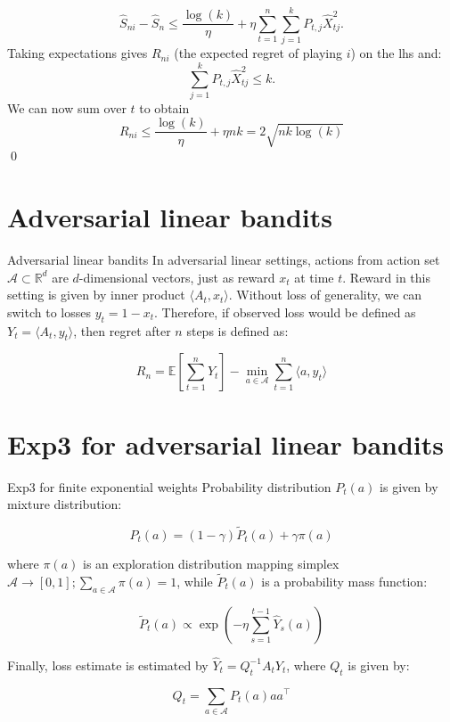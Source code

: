 \documentclass[aspectratio=169,xcolor=dvipsnames]{beamer}
\begin{document}
\begin{frame}
  \[
    \hat{S}_{ni} - \hat{S}_n
    \leq
    \frac{\log(k)}{\eta}
    +
    \eta
    \sum_{t=1}^n \sum_{j=1}^k P_{t,j} \hat{X}^2_{tj}.
  \]
  \pause
  Taking expectations gives $R_{ni}$ (the expected regret of playing $i$) on the lhs and:
  \[
    \sum_{j=1}^k P_{t,j} \hat{X}^2_{tj} \leq k.
  \]
  \pause
  We can now sum over $t$ to obtain
  \[
    R_{ni} \leq \frac{\log(k)}{\eta} + \eta n k = 2 \sqrt{n k \log (k)}
  \]
  \qed
\end{frame}

\section{Adversarial linear bandits}
\begin{frame}{Adversarial linear bandits}
    In adversarial linear settings, actions from action set $\mathbf{\mathcal{A}} \subset \mathbb{R}^d$ are $d$-dimensional vectors, just as reward $x_t$ at time $t$. Reward in this setting is given by inner product $\langle A_t, x_t \rangle$. Without loss of generality, we can switch to losses $y_t = 1 - x_t$. Therefore, if observed loss would be defined as $Y_t = \langle A_t, y_t \rangle$, then regret after $n$ steps is defined as:

    \begin{equation}
        R_n = \mathbb{E} \left[ \sum_{t=1}^{n} Y_t \right] - \min_{a \in \mathbf{\mathcal{A}}} \sum_{t=1}^{n} \langle a, y_t \rangle
    \end{equation}
\end{frame}

\section{Exp3 for adversarial linear bandits}
\begin{frame}{Exp3 for finite exponential weights}
    Probability distribution $P_t(a)$ is given by mixture distribution:

    \begin{equation}
        P_t(a) = (1 - \gamma)\tilde{P}_t(a) + \gamma \pi(a)
    \end{equation}

    where $\pi(a)$ is an exploration distribution mapping simplex $\mathbf{\mathcal{A}} \rightarrow [0,1] ; \sum_{a \in \mathbf{\mathcal{A}}} \pi(a) = 1$, while $\tilde{P}_t(a)$ is a probability mass function:

    \begin{equation}
        \tilde{P}_t(a) \propto \exp \left( -\eta \sum_{s=1}^{t-1} \hat{Y}_s(a) \right)
    \end{equation}

    Finally, loss estimate is estimated by $\hat{Y}_t = Q_t^{-1} A_t Y_t$, where $Q_t$ is given by:

    \begin{equation}
        Q_t = \sum_{a \in \mathbf{\mathcal{A}}} P_t(a)aa^{\intercal}
    \end{equation}

\end{frame}
\end{document}
